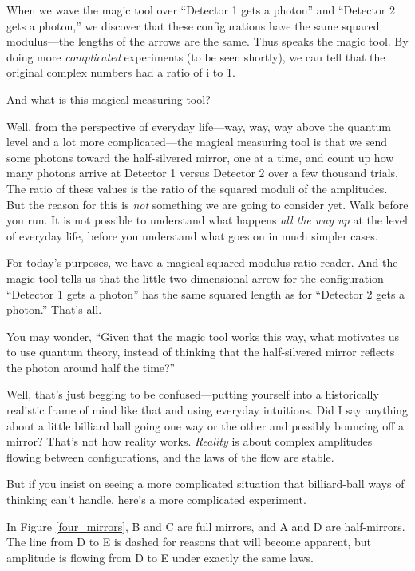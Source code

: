 {
 When we wave the magic tool over ``Detector 1
gets a photon'' and ``Detector 2
gets a photon,'' we discover that these
configurations have the same squared modulus---the lengths of the
arrows are the same. Thus speaks the magic tool. By doing more
\textit{complicated} experiments (to be seen shortly), we can tell that
the original complex numbers had a ratio of i to 1.}

{
 And what is this magical measuring tool?}

{
 Well, from the perspective of everyday life---way, way, way above
the quantum level and a lot more complicated---the magical measuring
tool is that we send some photons toward the half-silvered mirror, one
at a time, and count up how many photons arrive at Detector 1 versus
Detector 2 over a few thousand trials. The ratio of these values is the
ratio of the squared moduli of the amplitudes. But the reason for this
is \textit{not} something we are going to consider yet. Walk before you
run. It is not possible to understand what happens \textit{all the way
up} at the level of everyday life, before you understand what goes on
in much simpler cases.}

{
 For today's purposes, we have a magical
squared-modulus-ratio reader. And the magic tool tells us that the
little two-dimensional arrow for the configuration
``Detector 1 gets a photon'' has the
same squared length as for ``Detector 2 gets a
photon.'' That's all.}

{
 You may wonder, ``Given that the magic tool works
this way, what motivates us to use quantum theory, instead of thinking
that the half-silvered mirror reflects the photon around half the
time?''}

{
 Well, that's just begging to be confused---putting
yourself into a historically realistic frame of mind like that and
using everyday intuitions. Did I say anything about a little billiard
ball going one way or the other and possibly bouncing off a mirror?
That's not how reality works. \textit{Reality} is about
complex amplitudes flowing between configurations, and the laws of the
flow are stable.}

{
 But if you insist on seeing a more complicated situation that
billiard-ball ways of thinking can't handle,
here's a more complicated experiment.}


{
 In Figure \ref{four_mirrors}, B and C are full mirrors, and A and D are
half-mirrors. The line from D to E is dashed for reasons that will
become apparent, but amplitude is flowing from D to E under exactly the
same laws.}

